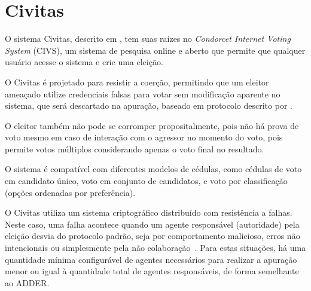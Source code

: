 \section{Civitas}

O sistema Civitas, descrito em \textcite{clarkson2008civitas}, tem suas raízes
no \textit{Condorcet Internet Voting System} (CIVS), um sistema de pesquisa
online e aberto que permite que qualquer usuário acesse o sistema e crie uma
eleição.

O Civitas é projetado para resistir a coerção, permitindo que um eleitor
ameaçado utilize credenciais falsas para votar sem modificação aparente no
sistema, que será descartado na apuração, baseado em protocolo descrito por
\textcite{juels2005coercion}.

O eleitor também não pode se corromper propositalmente, pois não há prova de
voto mesmo em caso de interação com o agressor no momento do voto, pois permite
votos múltiplos considerando apenas o voto final no resultado.

O sistema é compatível com diferentes modelos de cédulas, como cédulas de voto
em candidato único, voto em conjunto de candidatos, e voto por classificação
(opções ordenadas por preferência).

O Civitas utiliza um sistema criptográfico distribuído com resistência a
falhas. Neste caso, uma falha acontece quando um agente responsável
(autoridade) pela eleição desvia do protocolo padrão, seja por comportamento
malicioso, erros não intencionais ou simplesmente pela não
colaboração~\cite{davis2008civitas}. Para estas situações, há uma quantidade
mínima configurável de agentes necessários para realizar a apuração menor ou
igual à quantidade total de agentes responsáveis, de forma semelhante ao ADDER.
